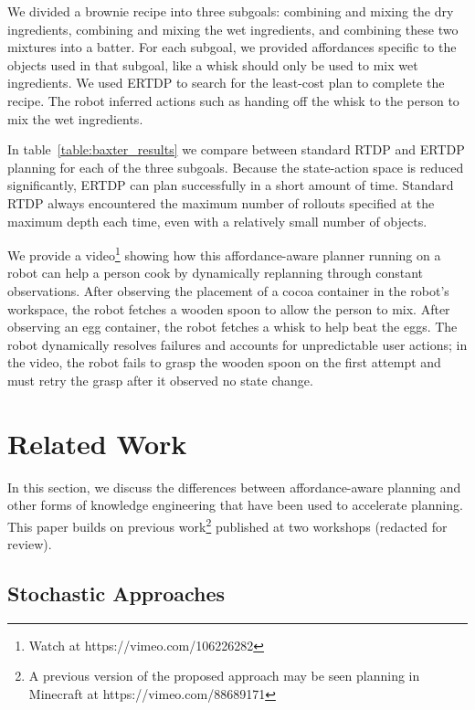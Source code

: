 \documentclass[letterpaper]{article}
\begin{document}
We divided a brownie recipe into three subgoals: combining and mixing
the dry ingredients, combining and mixing the wet ingredients, and
combining these two mixtures into a batter. For each subgoal, we
provided affordances specific to the objects used in that subgoal,
like a whisk should only be used to mix wet ingredients.  We used
ERTDP to search for the least-cost plan to complete the recipe.  The
robot inferred actions such as handing off the whisk to the person to
mix the wet ingredients.


In table~\ref{table:baxter_results} we compare between standard RTDP
and ERTDP planning for each of the three subgoals. Because the
state-action space is reduced significantly, ERTDP can plan
successfully in a short amount of time. Standard RTDP always
encountered the maximum number of rollouts specified at the maximum
depth each time, even with a relatively small number of objects.

We provide a video\footnote{Watch at https://vimeo.com/106226282} 
showing how this affordance-aware planner running
on a robot can help a person cook by dynamically replanning through
constant observations. After observing the placement of a cocoa
container in the robot's workspace, the robot fetches a wooden spoon
to allow the person to mix. After observing an egg container, the
robot fetches a whisk to help beat the eggs. 
The robot dynamically resolves failures and accounts for unpredictable
user actions; in the video, the robot fails to grasp the wooden spoon on
the first attempt and must retry the grasp after it observed no state
change.


\section{Related Work}
\label{sec:related-work}

In this section, we discuss the differences between affordance-aware
planning and other forms of knowledge engineering that have been used
to accelerate planning.  This paper builds on previous work\footnote{A
  previous version of the proposed approach may be seen planning in
  Minecraft at https://vimeo.com/88689171} published at two workshops
(redacted for review).

\subsection{Stochastic Approaches}
\end{document}
